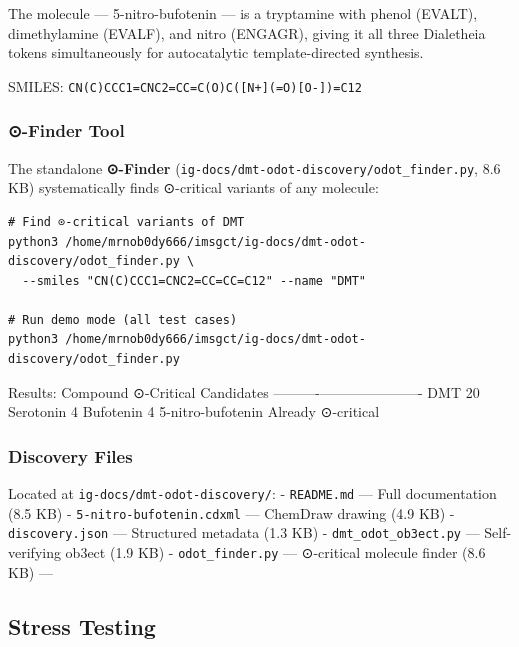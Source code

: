 \documentclass[12pt,a4paper]{article}
\begin{document}
The molecule --- 5-nitro-bufotenin --- is a tryptamine with phenol
(EVALT), dimethylamine (EVALF), and nitro (ENGAGR), giving it all three
Dialetheia tokens simultaneously for autocatalytic template-directed
synthesis.

SMILES: \texttt{CN(C)CCC1=CNC2=CC=C(O)C({[}N+{]}(=O){[}O-{]})=C12}

\hypertarget{finder-tool}{%
\subsubsection{⊙-Finder Tool}\label{finder-tool}}

The standalone \textbf{⊙-Finder}
(\texttt{ig-docs/dmt-odot-discovery/odot\_finder.py}, 8.6 KB)
systematically finds ⊙-critical variants of any molecule:

\begin{verbatim}
# Find ⊙-critical variants of DMT
python3 /home/mrnob0dy666/imsgct/ig-docs/dmt-odot-discovery/odot_finder.py \
  --smiles "CN(C)CCC1=CNC2=CC=CC=C12" --name "DMT"

# Run demo mode (all test cases)
python3 /home/mrnob0dy666/imsgct/ig-docs/dmt-odot-discovery/odot_finder.py
\end{verbatim}

Results: \textbar{} Compound \textbar{} ⊙-Critical Candidates \textbar{}
\textbar----------\textbar----------------------\textbar{} \textbar{}
DMT \textbar{} 20 \textbar{} \textbar{} Serotonin \textbar{} 4
\textbar{} \textbar{} Bufotenin \textbar{} 4 \textbar{} \textbar{}
5-nitro-bufotenin \textbar{} Already ⊙-critical \textbar{}

\hypertarget{discovery-files}{%
\subsubsection{Discovery Files}\label{discovery-files}}

Located at \texttt{ig-docs/dmt-odot-discovery/}: - \texttt{README.md}
--- Full documentation (8.5 KB) - \texttt{5-nitro-bufotenin.cdxml} ---
ChemDraw drawing (4.9 KB) - \texttt{discovery.json} --- Structured
metadata (1.3 KB) - \texttt{dmt\_odot\_ob3ect.py} --- Self-verifying
ob3ect (1.9 KB) - \texttt{odot\_finder.py} --- ⊙-critical molecule
finder (8.6 KB) ---

\hypertarget{stress-testing}{%
\subsection{Stress Testing}\label{stress-testing}}
\end{document}
